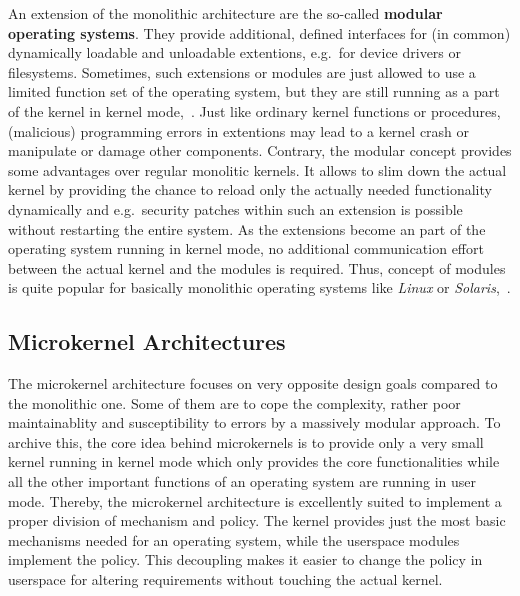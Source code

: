 An extension of the monolithic architecture are the so-called \textbf{modular operating systems}.
They provide additional, defined interfaces for (in common) dynamically loadable and unloadable extentions, e.g.\ for device drivers or filesystems. 
Sometimes, such extensions or modules are just allowed to use a limited function set of the operating system, but they are still running as a part of the kernel in kernel mode\cite{lfd430},~\cite{tanenbaum-modern-operating-systems}. 
Just like ordinary kernel functions or procedures, (malicious) programming errors in extentions may lead to a kernel crash or manipulate or damage other components.
Contrary, the modular concept provides some advantages over regular monolitic kernels.
It allows to slim down the actual kernel by providing the chance to reload only the actually needed functionality dynamically and e.g.\ security patches within such an extension is possible without restarting the entire system\cite{brause2017betriebssysteme}.
As the extensions become an part of the operating system running in kernel mode, no additional communication effort between the actual kernel and the modules is required.
Thus, concept of modules is quite popular for basically monolithic operating systems like \textit{Linux} or \textit{Solaris}\cite{brause2017betriebssysteme},~\cite{silberschatz2009operating}.


\subsection{Microkernel Architectures}\label{sec:microkernel-archs}
The microkernel architecture focuses on very opposite design goals compared to the monolithic one. 
Some of them are to cope the complexity, rather poor maintainablity and susceptibility to errors by a massively modular approach. 
To archive this, the core idea behind microkernels is to provide only a very small kernel running in kernel mode which only provides the core functionalities while all the other important functions of an operating system are running in user mode.
Thereby, the microkernel architecture is excellently suited to implement a proper division of mechanism and policy.
The kernel provides just the most basic mechanisms needed for an operating system, while the userspace modules implement the policy.
This decoupling makes it easier to change the policy in userspace for altering requirements without touching the actual kernel\cite{tanenbaum-modern-operating-systems}.

